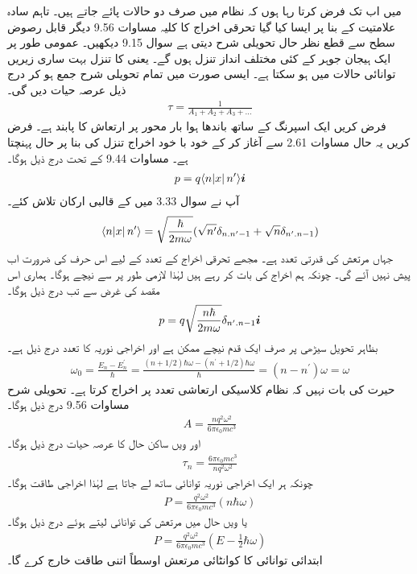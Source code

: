 میں اب تک فرض کرتا رہا ہوں کہ نظام میں صرف دو حالات پائے جاتے ہیں۔ تاہم سادہ علامتیت کے بنا پر ایسا کیا گیا تحرقی اخراج کا کلیہ مساوات \num{9.56} دیگر قابل رصوض سطح سے قطع نظر حال  تحویلی شرح دیتی ہے سوال \num{9.15} دیکھیں۔ عمومی طور پر ایک ہیجان جوہر کے کئی مختلف انداز تنزل ہوں گے۔ یعنی  کا تنزل بہت ساری زیریں توانائی حالات  میں ہو سکتا ہے۔ ایسی صورت میں تمام تحویلی شرح جمع ہو کر درج ذیل عرصہ حیات دیں گی۔
\begin{align}
	\tau = \frac{1}{A_1+A_2+A_3+\dots}
\end{align}
فرض کریں ایک  اسپرنگ کے ساتھ باندھا ہوا بار  محور  پر ارتعاش کا پابند ہے۔ فرض  کریں یہ حال  مساوات \num{2.61} سے آغاز کر کے خود با خود اخراج  تنزل کی بنا پر حال  پہنچتا ہے۔ مساوات  \num{9.44} کے تحت درج ذیل ہوگا۔
\begin{align*}
	p = q\langle n\abs{x}n^\prime\rangle{\boldsymbol{i}}
\end{align*}
آپ نے سوال \num{3.33} میں  کے قالبی ارکان تلاش کئے۔
\begin{align*}
	\langle n\abs{x}n^\prime\rangle = \sqrt{\frac{\hbar}{2m\omega}}(\sqrt{n^\prime}\delta_{n.n^\prime-1}+\sqrt{n}\delta_{n^\prime.n-1})
\end{align*}
جہاں مرتعش کی قدرتی تعدد  ہے۔ مجھے تحرقی اخراج کے تعدد کے لیے اس حرف کی ضرورت اب پیش نہیں آئے گی۔ چونکہ ہم اخراج کی بات کر رہے ہیں لہٰذا  لازمی طور پر  سے نیچے ہوگا۔ ہماری اس مقصد کی غرض سے تب درج ذیل ہوگا۔
\begin{align}
	p = q\sqrt{\frac{n\hbar}{2m\omega}}\delta_{n^\prime.n-1}{\boldsymbol{i}}
\end{align}
بظاہر تحویل سیڑھی پر صرف ایک قدم نیچے ممکن ہے اور اخراجی نوریہ کا تعدد درج ذیل ہے۔
\begin{align}
	\omega_0 = \frac{E_n-E_n^\prime}{\hbar} = \frac{(n+1/2)\hbar\omega - (n^\prime + 1/2)\hbar\omega}{\hbar} =(n-n^\prime)\omega = \omega
\end{align}
حیرت کی بات نہیں کہ نظام کلاسیکی ارتعاشی تعدد پر اخراج کرتا ہے۔ تحویلی شرح مساوات \num{9.56} درج ذیل ہوگا۔
\begin{align}
	A = \frac{nq^2\omega^2}{6\pi\epsilon_0mc^3}
\end{align}
اور ویں ساکن حال کا عرصہ حیات درج ذیل ہوگا۔
\begin{align}
	\tau_n = \frac{6\pi\epsilon_0mc^3}{nq^2\omega^2}
\end{align}
چونکہ ہر ایک اخراجی نوریہ  توانائی ساتھ لے جاتا ہے لہٰذا اخراجی طاقت  ہوگا۔
\begin{align*}
	P = \frac{q^2\omega^2}{6\pi\epsilon_0mc^3}(n\hbar\omega)
\end{align*}
یا ویں حال میں مرتعش کی توانائی  لیتے ہوئے درج ذیل ہوگا۔
\begin{align}
	P = \frac{q^2\omega^2}{6\pi\epsilon_0mc^3}(E-\frac{1}{2}\hbar\omega)
\end{align}
ابتدائی توانائی  کا کوانٹائی مرتعش اوسطاً اتنی طاقت خارج کرے گا۔

